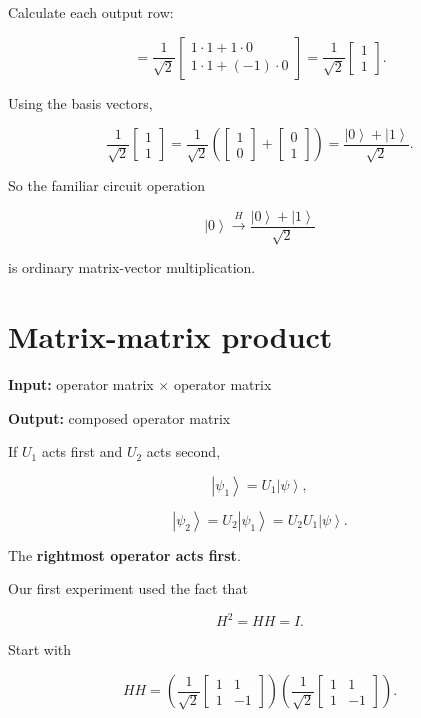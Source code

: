 \documentclass[11pt,a4paper]{article}
\newcommand{\ket}[1]{\left|#1\right\rangle}
\begin{document}
Calculate each output row:

\[
=
\frac{1}{\sqrt{2}}
\begin{bmatrix}
1\cdot1+1\cdot0\\
1\cdot1+(-1)\cdot0
\end{bmatrix}
=
\frac{1}{\sqrt{2}}
\begin{bmatrix}
1\\1
\end{bmatrix}.
\]

Using the basis vectors,

\[
\frac{1}{\sqrt{2}}
\begin{bmatrix}
1\\1
\end{bmatrix}
=
\frac{1}{\sqrt{2}}
\left(
\begin{bmatrix}
1\\0
\end{bmatrix}
+
\begin{bmatrix}
0\\1
\end{bmatrix}
\right)
=
\frac{\ket{0}+\ket{1}}{\sqrt{2}}.
\]

So the familiar circuit operation

\[
\ket{0}\xrightarrow{H}
\frac{\ket{0}+\ket{1}}{\sqrt{2}}
\]

is ordinary matrix-vector multiplication.

\section{Matrix-matrix product}

\textbf{Input:} operator matrix $\times$ operator matrix

\textbf{Output:} composed operator matrix

If $U_1$ acts first and $U_2$ acts second,

\[
\ket{\psi_1}=U_1\ket{\psi},
\]

\[
\ket{\psi_2}=U_2\ket{\psi_1}
            =U_2U_1\ket{\psi}.
\]

The \textbf{rightmost operator acts first}.

Our first experiment used the fact that

\[
H^2=HH=I.
\]

Start with

\[
HH
=
\left(
\frac{1}{\sqrt{2}}
\begin{bmatrix}
1 & 1\\
1 & -1
\end{bmatrix}
\right)
\left(
\frac{1}{\sqrt{2}}
\begin{bmatrix}
1 & 1\\
1 & -1
\end{bmatrix}
\right).
\]
\end{document}
